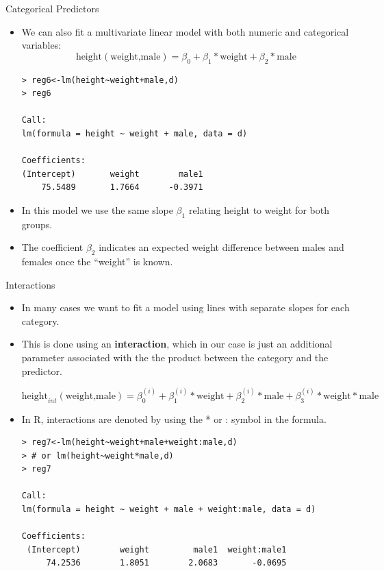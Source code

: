 \documentclass[handout]{beamer}
\begin{document}
\begin{frame}[fragile]{Categorical Predictors}
\scriptsize{ 
\begin{itemize}
\item We can also fit a multivariate linear model with both numeric and categorical variables:
  \begin{displaymath}
  \text{height}(\text{weight,male})=\beta_0+\beta_1*\text{weight}+\beta_2*\text{male}
 \end{displaymath} 

\begin{verbatim}
> reg6<-lm(height~weight+male,d)
> reg6

Call:
lm(formula = height ~ weight + male, data = d)

Coefficients:
(Intercept)       weight        male1  
    75.5489       1.7664      -0.3971  
\end{verbatim} 
 
\item In this model we use the same slope $\beta_1$ relating height to weight for both groups.

\item The coefficient $\beta_2$ indicates an expected weight difference between males and females once the ``weight'' is known.
 
\end{itemize}





}
\end{frame}

\begin{frame}[fragile]{Interactions}
\scriptsize{ 
\begin{itemize}
\item In many cases we want to fit a model using lines with separate slopes for each category.

\item This is done using an \textbf{interaction}, which in our case is just an additional parameter associated with the the product between the category and the predictor.

  \begin{displaymath}
  \text{height}_{int}(\text{weight,male})=\beta_0^{(i)}+\beta_1^{(i)}*\text{weight}+\beta_2^{(i)}*\text{male}+\beta_3^{(i)}*\text{weight}*\text{male}
 \end{displaymath}

\item In R, interactions are denoted by using the * or : symbol in the formula.
\begin{verbatim}
> reg7<-lm(height~weight+male+weight:male,d)
> # or lm(height~weight*male,d)
> reg7

Call:
lm(formula = height ~ weight + male + weight:male, data = d)

Coefficients:
 (Intercept)        weight         male1  weight:male1  
     74.2536        1.8051        2.0683       -0.0695  
\end{verbatim} 
 

\end{itemize}



}
\end{frame}
\end{document}
